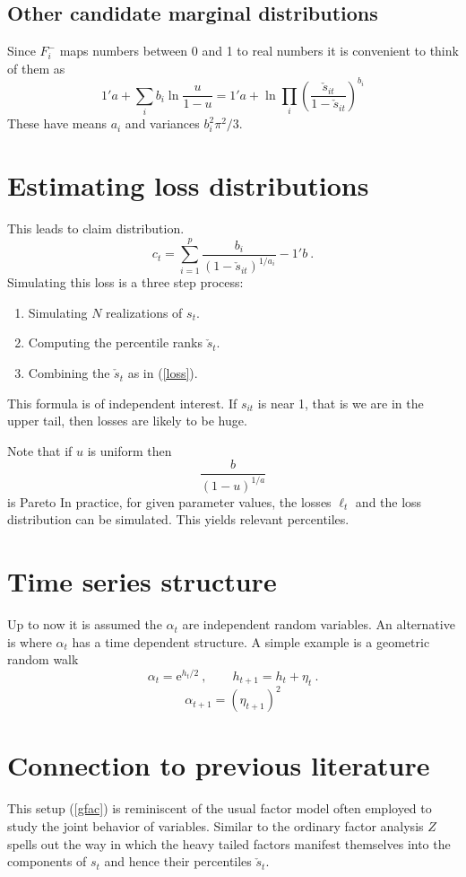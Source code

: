 \documentclass[a4paper,12pt]{article}
\newcommand{\e}{\mathrm{e}}
\newcommand{\eref}[1]{(\ref{#1})}
\begin{document}
\subsection{Other candidate marginal distributions}
Since $F_i^-$ maps numbers between 0 and 1 to real numbers it is convenient to think of them as
$$
1'a+\sum_i b_i\ln \frac{u}{1-u} = 1'a+\ln\prod_i\left(\frac{\check s_{it}}{1-\check s_{it}}\right)^{b_i}
$$
These have means $a_i$ and variances $b_i^2\pi^2/3$.

\section{Estimating loss distributions}

This leads to claim distribution.
\begin{equation}\label{loss}
c_t =\sum_{i=1}^p\frac{b_i}{(1-\check s_{it})^{1/a_i}}-1'b\ .
\end{equation}
Simulating this loss is a three step process:
\begin{enumerate}
  \item Simulating $N$ realizations of $s_t$.
  \item Computing the percentile ranks $\check s_t$.
  \item Combining the $\check s_t$ as in \eref{loss}.
\end{enumerate}
This formula is of independent interest. If $s_{it}$ is near 1, that is we are in the upper tail, then losses are likely to be huge.

Note that if $u$ is uniform then
$$
\frac{b}{(1-u)^{1/a}}
$$ is Pareto
In practice, for given parameter values, the losses $\ell_t$ and the loss distribution can be simulated.   This yields relevant percentiles.

\section{Time series structure}

Up to now it is assumed the $\alpha_t$ are independent random variables.  An alternative is where $\alpha_t$ has a time dependent structure.  A simple example is a geometric random walk
$$
\alpha_{t}=\e^{h_t/2}\ , \qquad h_{t+1}=h_t+\eta_t\ .
$$
$$
\alpha_{t+1}=(\eta_{t+1})^2
$$




\section{Connection to previous literature}
This setup \eref{gfac} is reminiscent of the usual factor model \cite{dnlawley1971fas} often employed to study the joint behavior of variables.  Similar to the ordinary factor analysis $Z$ spells out the way in which the heavy tailed factors manifest themselves into the components of $s_t$ and hence their percentiles $\check s_t$.
\end{document}
